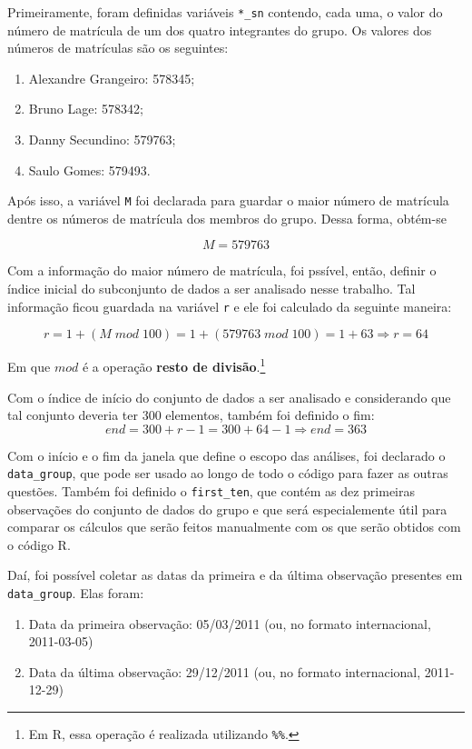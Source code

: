 \documentclass[10pt, a4paper]{article}
\begin{document}
Primeiramente, foram definidas variáveis \texttt{*\_sn} contendo, cada uma,
o valor do número de matrícula de um dos quatro integrantes do grupo. Os valores dos
números de matrículas são os seguintes:

\begin{enumerate}[label = \alph*)]
    \item Alexandre Grangeiro: 578345;
    \item Bruno Lage: 578342;
    \item Danny Secundino: 579763;
    \item Saulo Gomes: 579493.
\end{enumerate}

Após isso, a variável \texttt{M} foi declarada para guardar o maior número de matrícula dentre
os números de matrícula dos membros do grupo. Dessa forma, obtém-se

\[
\boxed{M = 579763}
\]

Com a informação do maior número de matrícula, foi pssível, então, definir o índice inicial do
subconjunto de dados a ser analisado nesse trabalho. Tal informação ficou guardada na variável
\texttt{r} e ele foi calculado da seguinte maneira:

\[
r = 1 + (M \; mod \; 100) = 1 + (579763 \; mod \; 100) = 1 + 63 \Rightarrow \boxed{r = 64}
\]

Em que $mod$ é a operação \textbf{resto de divisão}.\footnote{Em R, essa operação é realizada utilizando \texttt{\%\%}.}

Com o índice de início do conjunto de dados a ser analisado e considerando que tal conjunto deveria ter
300 elementos, também foi definido o fim:
\[
end = 300 + r - 1 = 300 + 64 - 1 \Rightarrow end = 363
\]

Com o início e o fim da janela que define o escopo das análises, foi declarado o \texttt{data\_group}, que pode ser usado
ao longo de todo o código para fazer as outras questões. Também foi definido o \texttt{first\_ten}, que contém as dez primeiras
observações do conjunto de dados do grupo e que será especialemente útil para comparar os cálculos que serão feitos manualmente com os que
serão obtidos com o código R.

Daí, foi possível coletar as datas da primeira e da última observação presentes em \texttt{data\_group}. Elas foram:
\begin{enumerate}[label = \alph*)]
    \item Data da primeira observação: 05/03/2011 (ou, no formato internacional, 2011-03-05)
    \item Data da última observação: 29/12/2011 (ou, no formato internacional, 2011-12-29) 
\end{enumerate}
\end{document}
